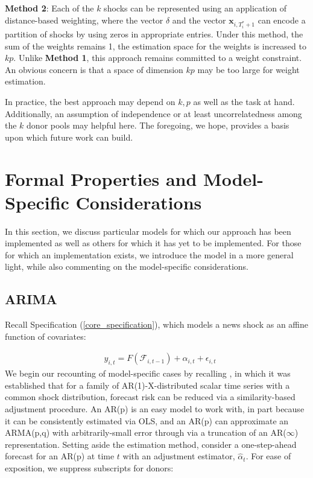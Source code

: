 \documentclass{uiucthesis2021}
\newcommand{\xx}{\textbf{x}}
\theoremstyle{definition}
\begin{document}
  \textbf{Method 2}: Each of the $k$ shocks can be represented using an application of distance-based weighting, where the vector $\delta$ and the vector $\xx_{i,T^{*}_{i}+1}$ can encode a partition of shocks by using zeros in appropriate entries.  Under this method, the sum of the weights remains 1, the estimation space for the weights is increased to $kp$.  Unlike \textbf{Method 1}, this approach remains committed to a weight constraint. An obvious concern is that a space of dimension $kp$ may be too large for weight estimation.
  
  In practice, the best approach may depend on $k,p$ as well as the task at hand.  Additionally, an assumption of independence or at least uncorrelatedness among the $k$ donor pools may helpful here.  The foregoing, we hope, provides a basis upon which future work can build.
  
  
  \section{Formal Properties and Model-Specific Considerations}\label{special_cases}
  
  In this section, we discuss particular models for which our approach has been implemented as well as others for which it has yet to be implemented.  For those for which an implementation exists, we introduce the model in a more general light, while also commenting on the model-specific considerations.
  
  
  \subsection{ARIMA}\label{ARIMA}
  Recall Specification (\ref{core_specification}), which models a news shock as an affine function of covariates:
  
  \begin{align*}
    &y_{i,t} = F(\mathcal{F}_{i,t-1}) + \alpha_{i,t} + \epsilon_{i,t}
  \end{align*}
  We begin our recounting of model-specific cases by recalling \cite[][]{lin2021minimizing}, in which it was established that for a family of AR(1)-X-distributed scalar time series with a common shock distribution, forecast risk can be reduced via a similarity-based adjustment procedure.  An AR(p) is an easy model to work with, in part because it can be consistently estimated via OLS, and an AR(p) can approximate an ARMA(p,q) with arbitrarily-small error through via a truncation of an AR($\infty$) representation.  Setting aside the estimation method, consider a one-step-ahead forecast for an AR(p) at time $t$ with an adjustment estimator, $\hat\alpha_{t}$.  For ease of exposition, we suppress subscripts for donors:
  
\end{document}
